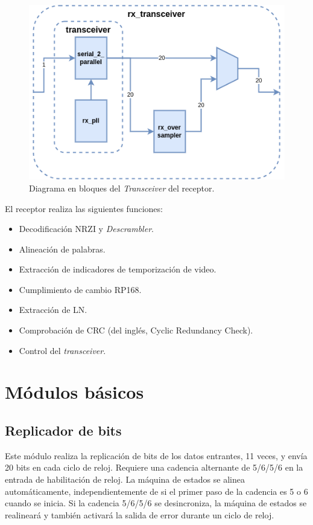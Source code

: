  \begin{figure}[htbp]
      \centering
      \includegraphics[width=\linewidth]{./Figures/rx_xcvr.png}
      \caption{Diagrama en bloques del \textit{Transceiver} del receptor.}\label{fig:rx_xcvr}
  \end{figure}
  \vspace{1cm}

  El receptor realiza las siguientes funciones:
  \begin{itemize}
      \item Decodificación NRZI y \textit{Descrambler}.
      \item Alineación de palabras.
      \item Extracción de indicadores de temporización de video.
      \item Cumplimiento de cambio RP168.
      \item Extracción de LN\@.
      \item Comprobación de CRC  (del inglés, Cyclic Redundancy Check)\@.
      \item Control del \textit{transceiver}.
  \end{itemize}

\section{Módulos básicos}

\subsection{Replicador de bits}

  Este módulo realiza la replicación de bits de los datos entrantes, 11 veces,
  y envía 20 bits en cada ciclo de reloj. Requiere una cadencia
  alternante de 5/6/5/6 en la entrada de habilitación de reloj. La máquina
  de estados se alinea automáticamente, independientemente de si el primer
  paso de la cadencia es 5 o 6 cuando se inicia. Si la cadencia 5/6/5/6 se
  desincroniza, la máquina de estados se realineará y también activará la
  salida de error durante un ciclo de reloj.


